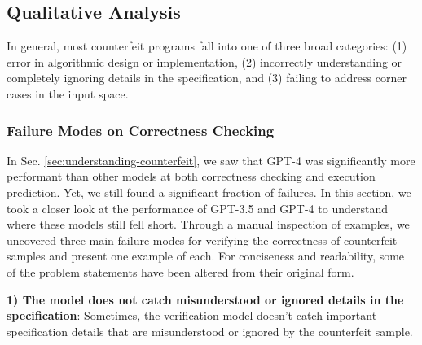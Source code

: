 \subsection{Qualitative Analysis} \label{sec:qual-analysis}
In general, most counterfeit programs fall into one of three broad categories: (1) error in algorithmic design or implementation, (2) incorrectly understanding or completely ignoring details in the specification, and (3) failing to address corner cases in the input space.

\subsubsection{Failure Modes on Correctness Checking}
In Sec. \ref{sec:understanding-counterfeit}, we saw that GPT-4 was significantly more performant than other models at both correctness checking and execution prediction. Yet, we still found a significant fraction of failures. In this section, we took a closer look at the performance of GPT-3.5 and GPT-4 to understand where these models still fell short. Through a manual inspection of examples, we uncovered three main failure modes for verifying the correctness of counterfeit samples and present one example of each. For conciseness and readability, some of the problem statements have been altered from their original form.


\textbf{1) The model does not catch misunderstood or ignored details in the specification}: Sometimes, the verification model doesn't catch important specification details that are misunderstood or ignored by the counterfeit sample.



